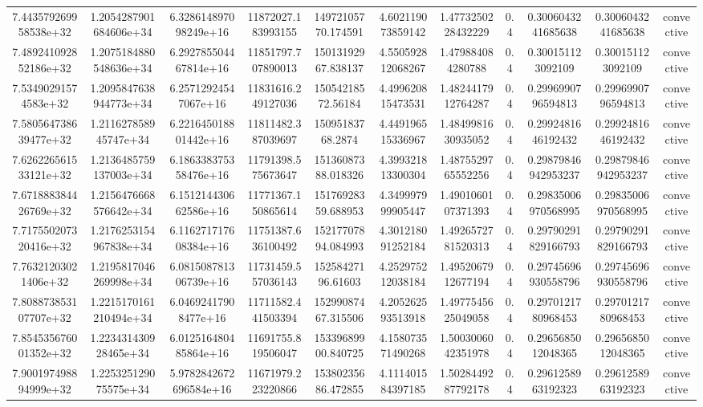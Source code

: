 \begin{table}
\begin{tabular}{ccccccccccc}
7.443579269958538e+32 & 1.2054287901684606e+34 & 6.328614897098249e+16 & 11872027.183993155 & 14972105770.174591 & 4.602119073859142 & 1.4773250228432229 & 0.4 & 0.3006043241685638 & 0.3006043241685638 & convective \\
7.489241092852186e+32 & 1.2075184880548636e+34 & 6.292785504467814e+16 & 11851797.707890013 & 15013192967.838137 & 4.550592812068267 & 1.479884084280788 & 0.4 & 0.300151123092109 & 0.300151123092109 & convective \\
7.53490291574583e+32 & 1.2095847638944773e+34 & 6.25712924547067e+16 & 11831616.249127036 & 15054218572.56184 & 4.499620815473531 & 1.4824417912764287 & 0.4 & 0.2996990796594813 & 0.2996990796594813 & convective \\
7.580564738639477e+32 & 1.211627858945747e+34 & 6.221645018801442e+16 & 11811482.387039697 & 15095183768.2874 & 4.449196515336967 & 1.4849981630935052 & 0.4 & 0.2992481646192432 & 0.2992481646192432 & convective \\
7.626226561533121e+32 & 1.2136485759137003e+34 & 6.186338375358476e+16 & 11791398.575673647 & 15136087388.018326 & 4.399321813300304 & 1.4875529765552256 & 0.4 & 0.29879846942953237 & 0.29879846942953237 & convective \\
7.671888384426769e+32 & 1.2156476668576642e+34 & 6.151214430662586e+16 & 11771367.150865614 & 15176928359.688953 & 4.349997999905447 & 1.4901060107371393 & 0.4 & 0.29835006970568995 & 0.29835006970568995 & convective \\
7.717550207320416e+32 & 1.2176253154967838e+34 & 6.116271717608384e+16 & 11751387.636100492 & 15217707894.084993 & 4.301218091252184 & 1.4926572781520313 & 0.4 & 0.29790291829166793 & 0.29790291829166793 & convective \\
7.76321203021406e+32 & 1.2195817046269998e+34 & 6.081508781306739e+16 & 11731459.557036143 & 15258427196.61603 & 4.252975212038184 & 1.4952067912677194 & 0.4 & 0.29745696930558796 & 0.29745696930558796 & convective \\
7.808873853107707e+32 & 1.2215170161210494e+34 & 6.04692417908477e+16 & 11711582.441503394 & 15299087467.315506 & 4.205262593513918 & 1.4977545625049058 & 0.4 & 0.2970121780968453 & 0.2970121780968453 & convective \\
7.854535676001352e+32 & 1.223431430928465e+34 & 6.012516480485864e+16 & 11691755.819506047 & 15339689900.840725 & 4.158073571490268 & 1.5003006042351978 & 0.4 & 0.2965685012048365 & 0.2965685012048365 & convective \\
7.900197498894999e+32 & 1.225325129075575e+34 & 5.9782842672696584e+16 & 11671979.223220866 & 15380235686.472855 & 4.111401584397185 & 1.5028449287792178 & 0.4 & 0.2961258963192323 & 0.2961258963192323 & convective \\

\end{tabular}
\end{table}
